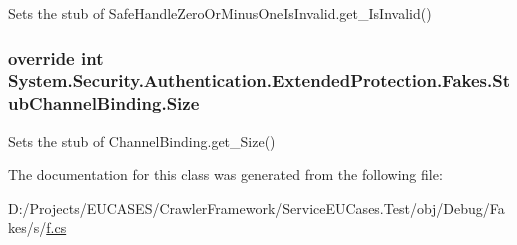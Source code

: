 Sets the stub of Safe\-Handle\-Zero\-Or\-Minus\-One\-Is\-Invalid.\-get\-\_\-\-Is\-Invalid()

\hypertarget{class_system_1_1_security_1_1_authentication_1_1_extended_protection_1_1_fakes_1_1_stub_channel_binding_a36b6ebc6b8054bff1af2903c6159f1ab}{
\subsubsection[{Size}]{\setlength{\rightskip}{0pt plus 5cm}override int System.\-Security.\-Authentication.\-Extended\-Protection.\-Fakes.\-Stub\-Channel\-Binding.\-Size\hspace{0.3cm}{\ttfamily [get]}}}\label{class_system_1_1_security_1_1_authentication_1_1_extended_protection_1_1_fakes_1_1_stub_channel_binding_a36b6ebc6b8054bff1af2903c6159f1ab}


Sets the stub of Channel\-Binding.\-get\-\_\-\-Size()



The documentation for this class was generated from the following file\-:\begin{DoxyCompactItemize}
\item 
D\-:/\-Projects/\-E\-U\-C\-A\-S\-E\-S/\-Crawler\-Framework/\-Service\-E\-U\-Cases.\-Test/obj/\-Debug/\-Fakes/s/\hyperlink{s_2f_8cs}{f.\-cs}\end{DoxyCompactItemize}
